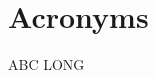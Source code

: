 \documentclass[a4paper,12pt]{report}
\begin{document}
\chapter{Acronyms}
\acs{ABC}
\acs{LONG}
\acronymsChapter
\end{document}
